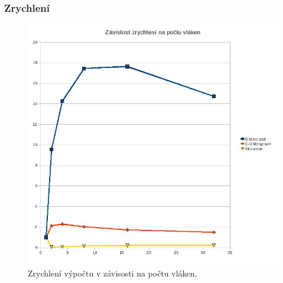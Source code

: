 \documentclass[12pt]{article}
\begin{document}
\subsubsection{Zrychlení}
\begin{figure}[H]
\begin{center}
\includegraphics[width=14cm]{mereni2.jpg}
\caption{Zrychlení výpočtu v závisosti na počtu vláken.}
\label{fig:testAinfib}
\end{center}
\end{figure}
\end{document}
